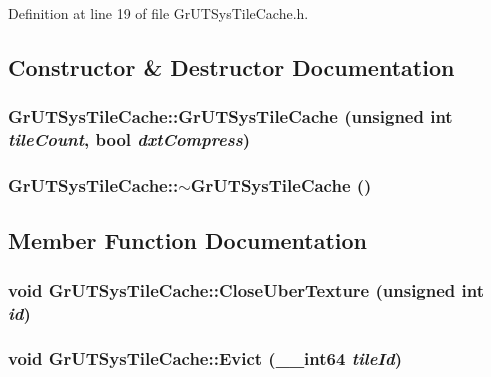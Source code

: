 Definition at line 19 of file GrUTSysTileCache.h.

\subsection{Constructor \& Destructor Documentation}
\hypertarget{class_gr_u_t_sys_tile_cache_21adf6d6aceeaa392188406cc4f6862e}{
\subsubsection[{GrUTSysTileCache}]{\setlength{\rightskip}{0pt plus 5cm}GrUTSysTileCache::GrUTSysTileCache (unsigned int {\em tileCount}, \/  bool {\em dxtCompress})}}
\label{class_gr_u_t_sys_tile_cache_21adf6d6aceeaa392188406cc4f6862e}


\hypertarget{class_gr_u_t_sys_tile_cache_b4af6ca5eb48b3072c7748727d433c11}{
\subsubsection[{$\sim$GrUTSysTileCache}]{\setlength{\rightskip}{0pt plus 5cm}GrUTSysTileCache::$\sim$GrUTSysTileCache ()}}
\label{class_gr_u_t_sys_tile_cache_b4af6ca5eb48b3072c7748727d433c11}




\subsection{Member Function Documentation}
\hypertarget{class_gr_u_t_sys_tile_cache_99709aa474875c406b71a3ea39b90e0b}{
\subsubsection[{CloseUberTexture}]{\setlength{\rightskip}{0pt plus 5cm}void GrUTSysTileCache::CloseUberTexture (unsigned int {\em id})}}
\label{class_gr_u_t_sys_tile_cache_99709aa474875c406b71a3ea39b90e0b}


\hypertarget{class_gr_u_t_sys_tile_cache_66ecd3069a48c51e88582fc0383c3377}{
\subsubsection[{Evict}]{\setlength{\rightskip}{0pt plus 5cm}void GrUTSysTileCache::Evict ({\bf \_\-\_\-int64} {\em tileId})}}
\label{class_gr_u_t_sys_tile_cache_66ecd3069a48c51e88582fc0383c3377}


